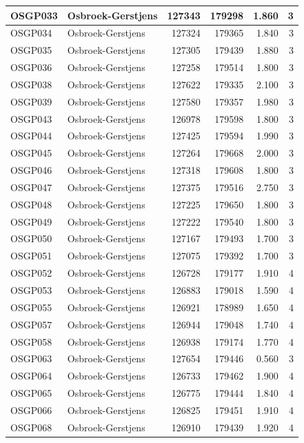 \documentclass[11pt,]{book}
\begin{document}
\begin{table}
\begin{tabular}[t]{l|l|r|r|r|r}
\hline
OSGP033 & Osbroek-Gerstjens & 127343 & 179298 & 1.860 & 3\\
\hline
OSGP034 & Osbroek-Gerstjens & 127324 & 179365 & 1.840 & 3\\
\hline
OSGP035 & Osbroek-Gerstjens & 127305 & 179439 & 1.880 & 3\\
\hline
OSGP036 & Osbroek-Gerstjens & 127258 & 179514 & 1.800 & 3\\
\hline
OSGP038 & Osbroek-Gerstjens & 127622 & 179335 & 2.100 & 3\\
\hline
OSGP039 & Osbroek-Gerstjens & 127580 & 179357 & 1.980 & 3\\
\hline
OSGP043 & Osbroek-Gerstjens & 126978 & 179598 & 1.800 & 3\\
\hline
OSGP044 & Osbroek-Gerstjens & 127425 & 179594 & 1.990 & 3\\
\hline
OSGP045 & Osbroek-Gerstjens & 127264 & 179668 & 2.000 & 3\\
\hline
OSGP046 & Osbroek-Gerstjens & 127318 & 179608 & 1.800 & 3\\
\hline
OSGP047 & Osbroek-Gerstjens & 127375 & 179516 & 2.750 & 3\\
\hline
OSGP048 & Osbroek-Gerstjens & 127225 & 179650 & 1.800 & 3\\
\hline
OSGP049 & Osbroek-Gerstjens & 127222 & 179540 & 1.800 & 3\\
\hline
OSGP050 & Osbroek-Gerstjens & 127167 & 179493 & 1.700 & 3\\
\hline
OSGP051 & Osbroek-Gerstjens & 127075 & 179392 & 1.700 & 3\\
\hline
OSGP052 & Osbroek-Gerstjens & 126728 & 179177 & 1.910 & 4\\
\hline
OSGP053 & Osbroek-Gerstjens & 126883 & 179018 & 1.590 & 4\\
\hline
OSGP055 & Osbroek-Gerstjens & 126921 & 178989 & 1.650 & 4\\
\hline
OSGP057 & Osbroek-Gerstjens & 126944 & 179048 & 1.740 & 4\\
\hline
OSGP058 & Osbroek-Gerstjens & 126938 & 179174 & 1.770 & 4\\
\hline
OSGP063 & Osbroek-Gerstjens & 127654 & 179446 & 0.560 & 3\\
\hline
OSGP064 & Osbroek-Gerstjens & 126733 & 179462 & 1.900 & 4\\
\hline
OSGP065 & Osbroek-Gerstjens & 126775 & 179444 & 1.840 & 4\\
\hline
OSGP066 & Osbroek-Gerstjens & 126825 & 179451 & 1.910 & 4\\
\hline
OSGP068 & Osbroek-Gerstjens & 126910 & 179439 & 1.920 & 4\\

\end{tabular}
\end{table}
\end{document}
